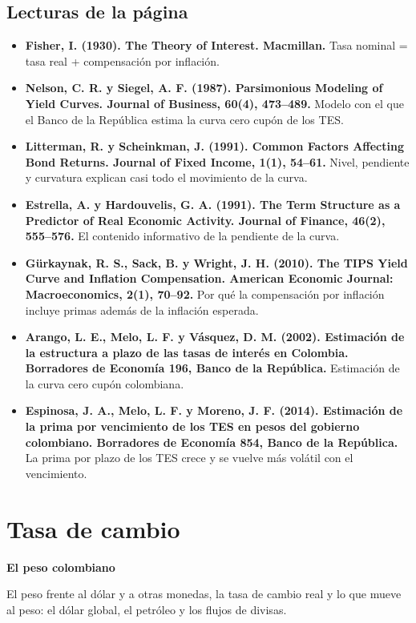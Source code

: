 \section*{Lecturas de la página}
\begin{itemize}\small
\item \textbf{Fisher, I. (1930). The Theory of Interest. Macmillan.} Tasa nominal = tasa real + compensación por inflación.
\item \textbf{Nelson, C. R. y Siegel, A. F. (1987). Parsimonious Modeling of Yield Curves. Journal of Business, 60(4), 473–489.} Modelo con el que el Banco de la República estima la curva cero cupón de los TES.
\item \textbf{Litterman, R. y Scheinkman, J. (1991). Common Factors Affecting Bond Returns. Journal of Fixed Income, 1(1), 54–61.} Nivel, pendiente y curvatura explican casi todo el movimiento de la curva.
\item \textbf{Estrella, A. y Hardouvelis, G. A. (1991). The Term Structure as a Predictor of Real Economic Activity. Journal of Finance, 46(2), 555–576.} El contenido informativo de la pendiente de la curva.
\item \textbf{Gürkaynak, R. S., Sack, B. y Wright, J. H. (2010). The TIPS Yield Curve and Inflation Compensation. American Economic Journal: Macroeconomics, 2(1), 70–92.} Por qué la compensación por inflación incluye primas además de la inflación esperada.
\item \textbf{Arango, L. E., Melo, L. F. y Vásquez, D. M. (2002). Estimación de la estructura a plazo de las tasas de interés en Colombia. Borradores de Economía 196, Banco de la República.} Estimación de la curva cero cupón colombiana.
\item \textbf{Espinosa, J. A., Melo, L. F. y Moreno, J. F. (2014). Estimación de la prima por vencimiento de los TES en pesos del gobierno colombiano. Borradores de Economía 854, Banco de la República.} La prima por plazo de los TES crece y se vuelve más volátil con el vencimiento.
\end{itemize}

\chapter{Tasa de cambio}
\label{atlas:mercados}

{\large\sffamily\bfseries El peso colombiano\par}\medskip

El peso frente al dólar y a otras monedas, la tasa de cambio real y lo que mueve al peso: el dólar global, el petróleo y los flujos de divisas.

